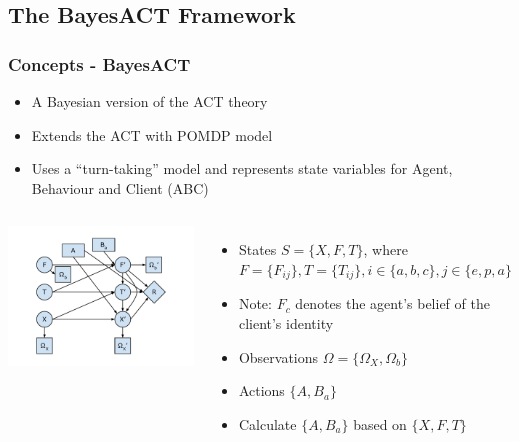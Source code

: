 \documentclass{beamer}
\begin{document}
\subsection{The BayesACT Framework}
\begin{frame}
\frametitle{Concepts - BayesACT}
\begin{itemize}
\item A Bayesian version of the ACT theory
\item Extends the ACT with POMDP model
\item Uses a ``turn-taking'' model and represents state variables for Agent, Behaviour and Client (ABC)
\end{itemize}
\begin{columns}[c]
\includegraphics[trim = 20mm 10mm 20mm 10mm, clip, width=\linewidth]{fig/fig-bayesact.pdf}
\begin{itemize}
\item States $S = \{X, F, T\}$, where $F = \{F_{ij}\}, T = \{T_{ij}\}, i \in \{a, b, c\}, j \in \{e, p, a\}$
\item Note: $F_{c}$ denotes the agent's belief of the client's identity
\item Observations $\Omega = \{\Omega_{X}, \Omega_{b}\}$
\item Actions $\{A, B_{a}\}$
\item Calculate $\{A, B_{a}\}$ based on $\{X, F, T\}$
\end{itemize}
\end{columns}
\end{frame}
\end{document}

